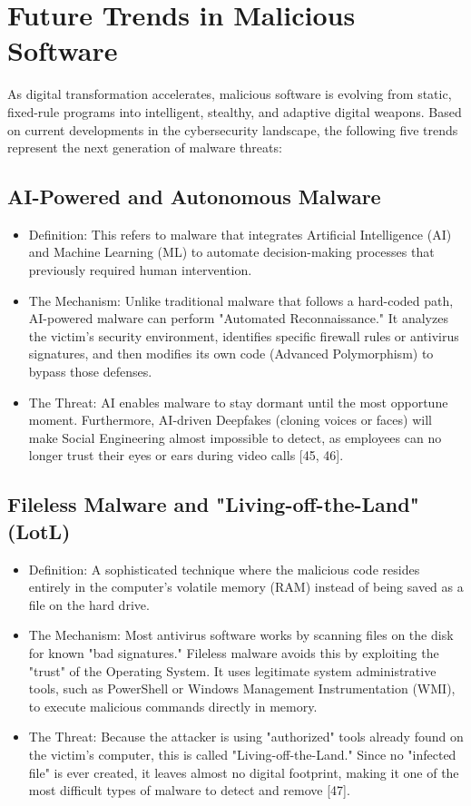 \section{Future Trends in Malicious Software}

As digital transformation accelerates, malicious software is evolving from static, fixed-rule programs into intelligent, stealthy, and adaptive digital weapons. Based on current developments in the cybersecurity landscape, the following five trends represent the next generation of malware threats:

\subsection{AI-Powered and Autonomous Malware}

\begin{itemize}
  \item Definition: This refers to malware that integrates Artificial Intelligence (AI) and Machine Learning (ML) to automate decision-making processes that previously required human intervention.
  \item The Mechanism: Unlike traditional malware that follows a hard-coded path, AI-powered malware can perform "Automated Reconnaissance." It analyzes the victim's security environment, identifies specific firewall rules or antivirus signatures, and then modifies its own code (Advanced Polymorphism) to bypass those defenses.
  \item The Threat: AI enables malware to stay dormant until the most opportune moment. Furthermore, AI-driven Deepfakes (cloning voices or faces) will make Social Engineering almost impossible to detect, as employees can no longer trust their eyes or ears during video calls [45, 46].
\end{itemize}

\subsection{Fileless Malware and "Living-off-the-Land" (LotL)}

\begin{itemize}
  \item Definition: A sophisticated technique where the malicious code resides entirely in the computer's volatile memory (RAM) instead of being saved as a file on the hard drive.
  \item The Mechanism: Most antivirus software works by scanning files on the disk for known "bad signatures." Fileless malware avoids this by exploiting the "trust" of the Operating System. It uses legitimate system administrative tools, such as PowerShell or Windows Management Instrumentation (WMI), to execute malicious commands directly in memory.
  \item The Threat: Because the attacker is using "authorized" tools already found on the victim's computer, this is called "Living-off-the-Land." Since no "infected file" is ever created, it leaves almost no digital footprint, making it one of the most difficult types of malware to detect and remove [47].
\end{itemize}

